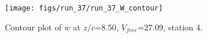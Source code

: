 \begin{figure}[H]
\centering
\texttt{[image: figs/run\_37/run\_37\_W\_contour]}
\caption{Contour plot of $\overline{w}$ at $z/c$=8.50, $V_{free}$=27.09, station 4.}
\label{fig:run_37_W_contour}
\end{figure}


